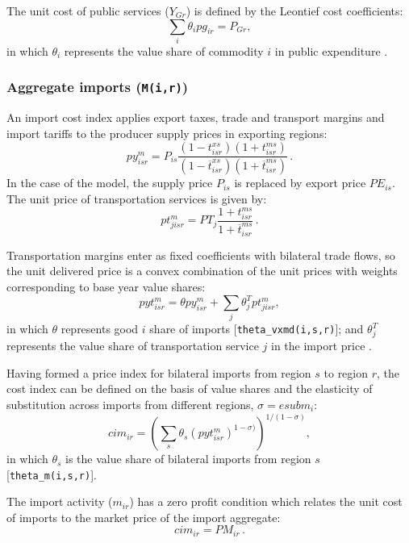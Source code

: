 The unit cost of public services ($Y_{Gr}$) is defined by the Leontief
cost coefficients:
\begin{equation}
\sum_i \theta_i pg_{ir}  = P_{Gr},
\end{equation}
in which $\theta_i$ represents the value share of commodity $i$ in
public expenditure \hfill {}.

\subsubsection[Aggregate imports]{Aggregate imports (\texttt{M(i,r)})}

An import cost index applies export taxes, trade and transport margins
and import tariffs to the producer supply prices in exporting regions:
$$py^m_{isr} = P_{is}
\frac{(1-t^{xs}_{isr})(1+t^{ms}_{isr})}
{(1-\overline{t}^{xs}_{isr})(1+\overline{t}^{ms}_{isr})}\,.$$ In the
case of the \SOE model, the supply price $P_{is}$ is replaced by
export price $\mathit{PE}_{is}$. The unit price of transportation services is
given by: $$pt^m_{jisr} = \mathit{PT}_j
\frac{1+t^{ms}_{isr}}{1+\overline{t}^{ms}_{isr}}\,.$$

Transportation margins enter as fixed coefficients with bilateral
trade flows, so the unit delivered price is a convex combination of
the unit prices with weights corresponding to base year value shares:
$$pyt^m_{isr} = \theta py^m_{isr} + \sum_j \theta^T_j pt^m_{jisr},$$
in which $\theta$ represents good $i$ share of imports
[{\small \texttt{theta\_vxmd(i,s,r)}}]; and $\theta^T_j$
represents the value share of transportation service $j$ in the import
price \hfill {}.

Having formed a price index for bilateral imports from region $s$ to
region $r$, the \CES cost index can be defined on the basis of value
shares and the elasticity of substitution across imports from
different regions, $\sigma = \textit{esubm}_i$:
$$\textit{cim}_{ir} = \left(\sum_s \theta_s (pyt^m_{isr})^{1-\sigma)}
\right)^{1/(1-\sigma)} ,$$
in which $\theta_s$ is the  value share of bilateral imports from
region $s$ [{\small \texttt{theta\_m(i,s,r)}}].

The import activity ($m_{ir}$) has a zero
profit condition which relates the unit cost of imports to the market
price of the import aggregate:
\begin{equation}
cim_{ir} = \mathit{PM}_{ir}\,.
\end{equation}

